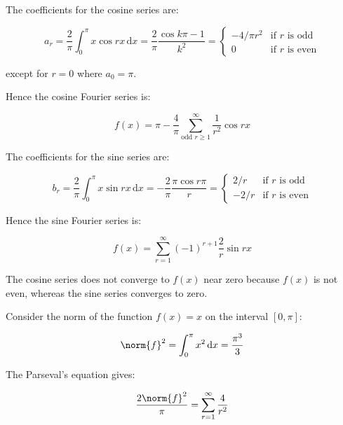 \documentclass[12pt]{article}
\begin{document}
The coefficients for the cosine series are:

\begin{equation}
    a_{r} = \frac{2}{\pi} \int_{0}^{\pi} x \cos{rx} \, \mathrm{d}x = \frac{2}{\pi} \frac{\cos{k\pi} - 1}{k^{2}} =
    \begin{cases}
        -4/\pi r^{2} & \text{if } r \text{ is odd} \\
        0 & \text{if } r \text{ is even}
    \end{cases}
\end{equation}

except for $r = 0$ where $a_{0} = \pi$.

Hence the cosine Fourier series is:

\begin{equation}
    f(x) = \pi - \frac{4}{\pi} \sum_{\text{odd }r \ge 1}^{\infty} \frac{1}{r^{2}} \cos{rx}
\end{equation}

The coefficients for the sine series are:

\begin{equation}
    b_{r} = \frac{2}{\pi} \int_{0}^{\pi} x \sin{rx} \, \mathrm{d}x = -\frac{2}{\pi} \frac{\pi \cos{r\pi}}{r} =
    \begin{cases}
        2/r & \text{if } r \text{ is odd} \\
        -2/r & \text{if } r \text{ is even}
    \end{cases}
\end{equation}

Hence the sine Fourier series is:

\begin{equation}
    f(x) = \sum_{r = 1}^{\infty} (-1)^{r + 1} \frac{2}{r} \sin{rx}
\end{equation}

The cosine series does not converge to $f(x)$ near zero because $f(x)$ is not even, whereas the sine series converges to zero.

Consider the norm of the function $f(x) = x$ on the interval $[0, \pi]$:

\begin{equation}
    \norm{f}^{2} = \int_{0}^{\pi} x^{2} \, \mathrm{d}x = \frac{\pi^{3}}{3}
\end{equation}

The Parseval's equation gives:

\begin{equation}
    \frac{2\norm{f}^{2}}{\pi} = \sum_{r = 1}^{\infty} \frac{4}{r^{2}}
\end{equation}
\end{document}
